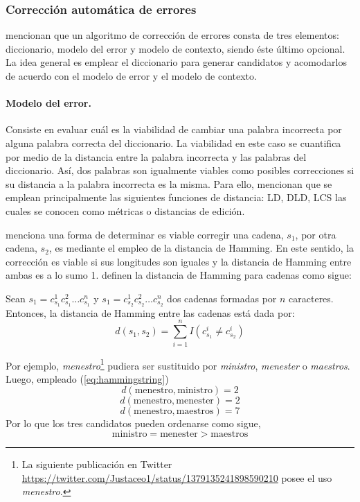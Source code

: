 \subsubsection{Corrección automática de errores}

\cite{hladek2020survey} mencionan que un algoritmo de corrección de errores consta de tres elementos: diccionario, modelo del error y modelo de contexto, siendo éste último opcional. La idea general es emplear el diccionario para generar candidatos y acomodarlos de acuerdo con el modelo de error y el modelo de contexto.

\paragraph{Modelo del error.} Consiste en evaluar cuál es la viabilidad de cambiar una palabra incorrecta por alguna palabra correcta del diccionario. La viabilidad en este caso se cuantifica por medio de la distancia entre la palabra incorrecta y las palabras del diccionario. Así, dos palabras son igualmente viables como posibles correcciones si su distancia a la palabra incorrecta es la misma. Para ello, \cite{hladek2020survey} mencionan que se emplean principalmente las siguientes funciones de distancia: LD, DLD, LCS las cuales se conocen como métricas o distancias de edición.

\cite{damerau1964technique} menciona una forma de determinar es viable corregir una cadena, $s_1$, por otra cadena, $s_2$, es mediante el empleo de la distancia de Hamming. En este sentido, la corrección es viable si sus longitudes son iguales y la distancia de Hamming entre ambas es a lo sumo 1. \cite{waggener1995pulse} definen la distancia de Hamming para cadenas como sigue:
\begin{defi}
	Sean $s_1 = c_{s_1}^1c_{s_1}^2\ldots c_{s_1}^n$ y $s_1 = c_{s_2}^1c_{s_2}^2\ldots c_{s_2}^n$ dos cadenas formadas por $n$ caracteres. Entonces, la distancia de Hamming entre las cadenas está dada por:
	\begin{equation}
		\label{eq:hammingstring}
		d(s_1,s_2) = \sum_{i=1}^{n} I\left(c_{s_1}^i \neq c_{s_2}^i\right)
	\end{equation}
\end{defi}

Por ejemplo, \textit{menestro}\footnote{La siguiente publicación en Twitter \url{https://twitter.com/Justaceo1/status/1379135241898590210} posee el uso \textit{menestro}.} pudiera ser sustituido por \textit{ministro}, \textit{menester} o \textit{maestros}. Luego, empleado (\ref{eq:hammingstring})
$$d(\mbox{menestro},\mbox{ministro}) = 2$$ $$d(\mbox{menestro},\mbox{menester}) = 2$$ $$d(\mbox{menestro},\mbox{maestros}) = 7$$
Por lo que los tres candidatos pueden ordenarse como sigue, $$\mbox{ministro} = \mbox{menester} > \mbox{maestros}$$

